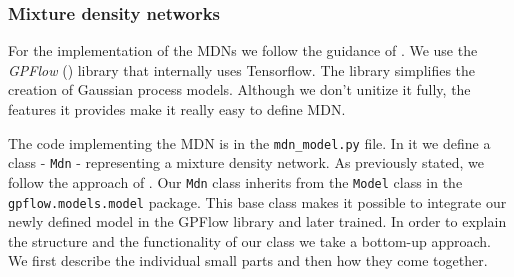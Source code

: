 \documentclass[12pt,a4paper,twoside]{scrartcl}
\numberwithin{equation}{section}
\begin{document}
\subsubsection{Mixture density networks}
\label{sec:impl-mdn}
For the implementation of the MDNs we follow the guidance of \cite{mdntut}. We use the \emph{GPFlow} (\cite{gpflow}) library that internally uses Tensorflow. The library simplifies the creation of Gaussian process models. Although we don't unitize it fully, the features it provides make it really easy to define MDN.

The code implementing the MDN is in the \texttt{mdn\_model.py} file. In it we define a class - \texttt{Mdn} - representing a mixture density network. As previously stated, we follow the approach of \cite{mdntut}. Our \texttt{Mdn} class inherits from the \texttt{Model} class in the \texttt{gpflow.models.model} package. This base class makes it possible to integrate our newly defined model in the GPFlow library and later trained. In order to explain the structure and the functionality of our class we take a bottom-up approach. We first describe the individual small parts and then how they come together.
\end{document}
